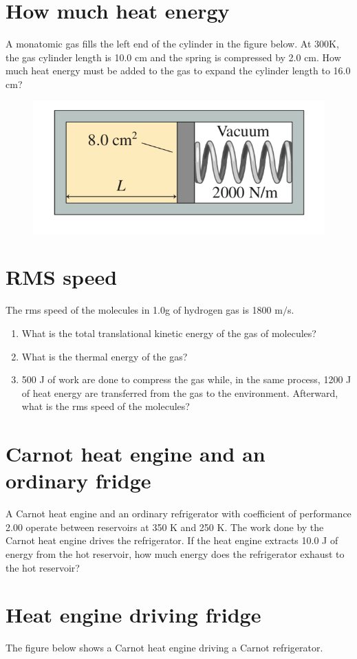 \documentclass[11pt]{article}
\begin{document}
\section{How much heat energy}
A monatomic gas fills the left end of the cylinder in the figure below. At 300K, the gas cylinder length is 10.0 cm and the spring is compressed by 2.0 cm. How much heat energy must be added to the gas to expand the cylinder length to 16.0 cm?

\begin{figure}[h!]
\centering
\includegraphics[width=0.5\linewidth]{Final_2}
\end{figure}

\section{RMS speed}
The rms speed of the molecules in 1.0g of hydrogen gas is 1800 m$/$s.
\begin{enumerate}
\item What is the total translational kinetic energy of the gas of molecules?
\item What is the thermal energy of the gas?
\item 500 J of work are done to compress the gas while, in the same process, 1200 J of heat energy are transferred from the gas to the environment. Afterward, what is the rms speed of the molecules?
\end{enumerate}

\section{Carnot heat engine and an ordinary fridge}
A Carnot heat engine and an ordinary refrigerator with coefficient of performance 2.00 operate between reservoirs at 350 K and 250 K. The work done by the Carnot heat engine drives the refrigerator. If the heat engine extracts 10.0 J of energy from the hot reservoir, how much energy does the refrigerator exhaust to the hot reservoir?

\section{Heat engine driving fridge}
The figure below shows a Carnot heat engine driving a Carnot refrigerator.
\end{document}
